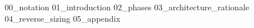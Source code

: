 {00_notation}
\pagebreak
{}
{01_introduction}
{02_phases}
{03_architecture_rationale}
{04_reverse_sizing}
\pagebreak
{05_appendix}